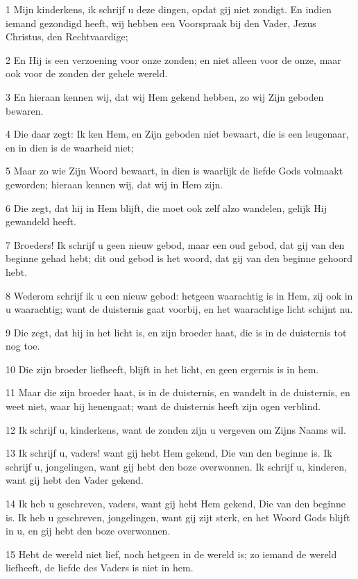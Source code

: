 \par 1 Mijn kinderkens, ik schrijf u deze dingen, opdat gij niet zondigt. En indien iemand gezondigd heeft, wij hebben een Voorspraak bij den Vader, Jezus Christus, den Rechtvaardige;
\par 2 En Hij is een verzoening voor onze zonden; en niet alleen voor de onze, maar ook voor de zonden der gehele wereld.
\par 3 En hieraan kennen wij, dat wij Hem gekend hebben, zo wij Zijn geboden bewaren.
\par 4 Die daar zegt: Ik ken Hem, en Zijn geboden niet bewaart, die is een leugenaar, en in dien is de waarheid niet;
\par 5 Maar zo wie Zijn Woord bewaart, in dien is waarlijk de liefde Gods volmaakt geworden; hieraan kennen wij, dat wij in Hem zijn.
\par 6 Die zegt, dat hij in Hem blijft, die moet ook zelf alzo wandelen, gelijk Hij gewandeld heeft.
\par 7 Broeders! Ik schrijf u geen nieuw gebod, maar een oud gebod, dat gij van den beginne gehad hebt; dit oud gebod is het woord, dat gij van den beginne gehoord hebt.
\par 8 Wederom schrijf ik u een nieuw gebod: hetgeen waarachtig is in Hem, zij ook in u waarachtig; want de duisternis gaat voorbij, en het waarachtige licht schijnt nu.
\par 9 Die zegt, dat hij in het licht is, en zijn broeder haat, die is in de duisternis tot nog toe.
\par 10 Die zijn broeder liefheeft, blijft in het licht, en geen ergernis is in hem.
\par 11 Maar die zijn broeder haat, is in de duisternis, en wandelt in de duisternis, en weet niet, waar hij henengaat; want de duisternis heeft zijn ogen verblind.
\par 12 Ik schrijf u, kinderkens, want de zonden zijn u vergeven om Zijns Naams wil.
\par 13 Ik schrijf u, vaders! want gij hebt Hem gekend, Die van den beginne is. Ik schrijf u, jongelingen, want gij hebt den boze overwonnen. Ik schrijf u, kinderen, want gij hebt den Vader gekend.
\par 14 Ik heb u geschreven, vaders, want gij hebt Hem gekend, Die van den beginne is. Ik heb u geschreven, jongelingen, want gij zijt sterk, en het Woord Gods blijft in u, en gij hebt den boze overwonnen.
\par 15 Hebt de wereld niet lief, noch hetgeen in de wereld is; zo iemand de wereld liefheeft, de liefde des Vaders is niet in hem.
